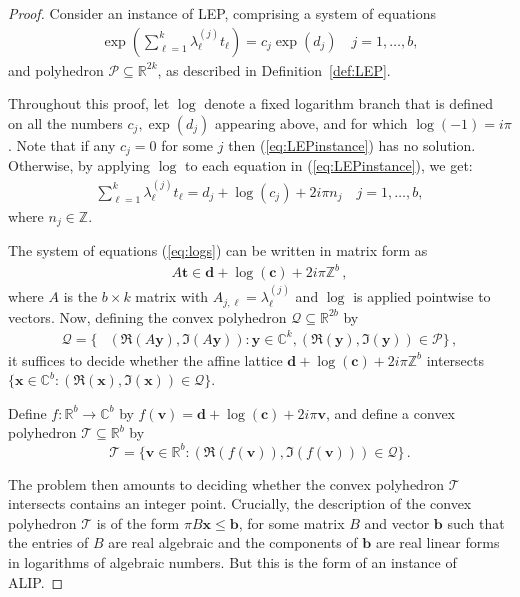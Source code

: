 \begin{proof}
Consider an instance of LEP, comprising a system of equations
\begin{align}
 \exp\left(\sum_{\ell=1}^k \lambda_\ell^{(j)} t_\ell \right) = c_j \exp (d_j)
\quad j=1,\ldots,b,
\label{eq:LEPinstance}
\end{align}
and polyhedron $\mathcal{P}\subseteq \mathbb{R}^{2k}$, as described in
Definition~\ref{def:LEP}.

Throughout this proof, let $\log$ denote a fixed logarithm branch that
is defined on all the numbers $c_j, \exp(d_j)$ appearing
above, and for which $\log(-1) = i \pi$. Note that if any $c_j=0$ for
some $j$ then (\ref{eq:LEPinstance}) has no solution. Otherwise, by
applying $\log$ to each equation in (\ref{eq:LEPinstance}),
we get:
\begin{align}
\sum_{\ell=1}^k \lambda_\ell^{(j)} t_\ell = d_j+\log(c_j) + 2i\pi n_j \quad j=1,\ldots,b,
\label{eq:logs}
\end{align}
where $n_j \in \mathbb{Z}$.

The system of equations (\ref{eq:logs}) can be written in matrix form as
\begin{align*}
A \boldsymbol{t} \in \boldsymbol{d}+\log(\boldsymbol{c}) +
2i\pi \mathbb{Z}^b \, ,
\end{align*}
where $A$ is the $b\times k$ matrix with $A_{j,\ell} = \lambda_\ell^{(j)}$ and $\log$
is applied pointwise to vectors.
Now, defining the convex polyhedron $\mathcal{Q}\subseteq \mathbb{R}^{2b}$ by
\begin{align*}
\mathcal{Q} = \lbrace &(\Re(A\boldsymbol{y}), \Im(A\boldsymbol{y})) :
\boldsymbol{y}\in\mathbb{C}^k, (\Re(\boldsymbol{y}), \Im(\boldsymbol{y})) \in \mathcal{P} \rbrace \, ,
\end{align*}
it suffices to decide whether the affine lattice
$\boldsymbol{d} + \log(\boldsymbol{c})+ 2i\pi  \mathbb{Z}^b$
intersects
$\lbrace \boldsymbol{x} \in \mathbb{C}^b : (\Re(\boldsymbol{x}),
\Im(\boldsymbol{x})) \in \mathcal{Q} \rbrace$.

Define $f:\mathbb{R}^b \rightarrow \mathbb{C}^b$ by
$f(\boldsymbol{v})= \boldsymbol{d} + \log(\boldsymbol{c}) +
2i\pi \boldsymbol{v}$,
and define a convex polyhedron $\mathcal{T}\subseteq \mathbb{R}^b$ by
\[\mathcal{T}=\{ \boldsymbol{v}\in\mathbb{R}^b : (\Re(f(\boldsymbol{v})),
\Im (f(\boldsymbol{v}))) \in \mathcal{Q} \} \, . \]

The problem then amounts to deciding whether the convex polyhedron
$\mathcal{T}$ intersects contains an integer point. Crucially, the
description of the convex polyhedron $\mathcal{T}$ is of the form
$\pi B\boldsymbol{x} \leq \boldsymbol{b}$, for some matrix $B$ and
vector $\boldsymbol{b}$ such that the entries of $B$ are real
algebraic and the components of $\boldsymbol{b}$ are real linear forms
in logarithms of algebraic numbers.  But this is the form of an
instance of ALIP.
\end{proof}


